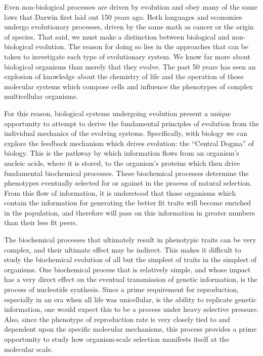 Even non-biological processes are driven by evolution and obey many of the same laws that Darwin first laid out 150 years ago. Both languages and economies undergo evolutionary processes, driven by the same math as cancer or the origin of species\cite{ANowak:2006p857}. That said, we must make a distinction between biological and non-biological evolution. The reason for doing so lies in the approaches that can be taken to investigate each type of evolutionary system. We know far more about biological organisms than merely that they evolve. The past 50 years has seen an explosion of knowledge about the chemistry of life and the operation of those molecular systems which compose cells and influence the phenotypes of complex multicellular organisms.

For this reason, biological systems undergoing evolution present a unique opportunity to attempt to derive the fundamental principles of evolution from the individual mechanics of the evolving systems. Specifically, with biology we can explore the feedback mechanism which drives evolution: the ``Central Dogma'' of biology. This is the pathway by which information flows from an organism's nucleic acids, where it is stored, to the organism's proteins which then drive fundamental biochemical processes\cite{Thieffry:1998p913}. These biochemical processes determine the phenotypes eventually selected for or against in the process of natural selection. From this flow of information, it is understood that those organisms which contain the information for generating the better fit traits will become enriched in the population, and therefore will pass on this information in greater numbers than their less fit peers\cite{Darwin:1883p935}.

The biochemical processes that ultimately result in phenotypic traits can be very complex, and their ultimate effect may be indirect. This makes it difficult to study the biochemical evolution of all but the simplest of traits in the simplest of organisms. One biochemical process that is relatively simple, and whose impact has a very direct effect on the eventual transmission of genetic information, is the process of nucleotide synthesis. Since a prime requirement for reproduction, especially in an era when all life was unicellular, is the ability to replicate genetic information, one would expect this to be a process under heavy selective pressure. Also, since the phenotype of reproduction rate is very closely tied to and dependent upon the specific molecular mechanisms, this process provides a prime opportunity to study how organism-scale selection manifests itself at the molecular scale.

